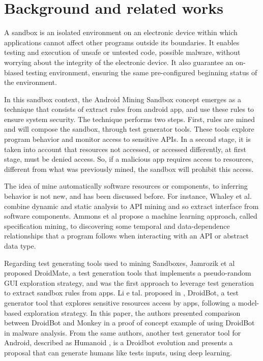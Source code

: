 \section{Background and related works}

A sandbox is an isolated environment on an electronic device within which applications cannot affect other programs outside its boundaries. It enables testing and execution of unsafe or untested code, possible malware, without worrying about the integrity of the electronic device. It also guarantee an on-biased testing environment, ensuring the same pre-configured beginning status of the environment.

In this sandbox context, the Android Mining Sandbox concept emerges as a technique that consists of extract rules from android app, and use these rules to ensure system security. The technique performs two steps. First, rules are mined and will compose the sandbox, through test generator tools. These tools explore program behavior and monitor access to sensitive APIs. In a second stage, it is taken into account that resources not accessed, or accessed differently, at first stage, must be denied access. So, if a malicious app requires access to resources, different from what was previously mined, the sandbox will prohibit this access.

The idea of mine automatically software resources or components, to inferring behavior is not new, and has been discussed before. For instance, Whaley et al. \cite{DBLP:conf/issta/WhaleyML02} combine dynamic and static analysis to API mining and so extract interface from software components. Ammons et al \cite{DBLP:conf/popl/AmmonsBL02} propose a machine learning
approach, called specification mining, to discovering some temporal and data-dependence relationships that a program follows when interacting with an API or abstract data type.

Regarding test generating tools used to mining Sandboxes, Jamrozik et al \cite{DBLP:conf/icse/JamrozikZ16} proposed DroidMate, a test generation tools that implements a pseudo-random GUI exploration strategy, and was the first approach to leverage test generation to extract sandbox rules from apps. Li e tal. proposed in \cite{DBLP:conf/icse/LiYGC17}, DroidBot, a test generator tool that explores sensitive resources access by apps, following a model-based exploration strategy. In this paper, the authors presented comparison between DroidBot and Monkey \cite{Monkey} in a proof of concept example of using DroidBot in malware analysis. From the same authors, another test generator tool for Android, described as Humanoid \cite{DBLP:conf/kbse/LiY0C19}, is a Droidbot evolution and presents a proposal that can generate humans like tests inputs, using deep learning.

